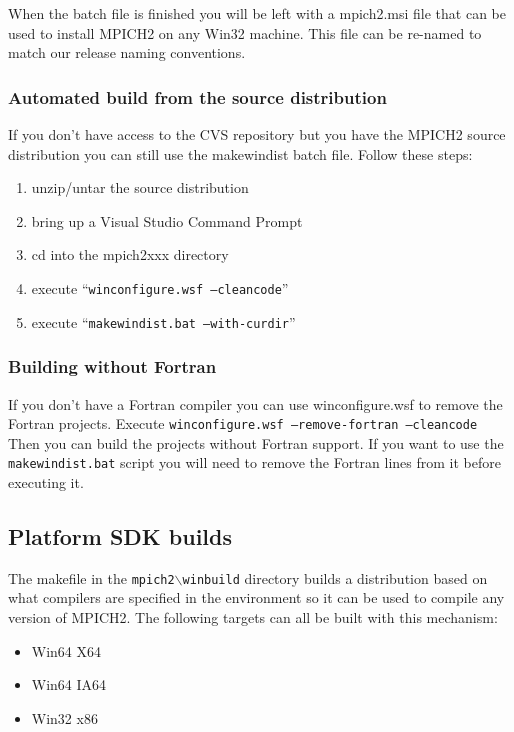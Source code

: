 \documentclass[dvipdfm,11pt]{article}
\begin{document}
When the batch file is finished you will be left with a mpich2.msi file that can be used to
install MPICH2 on any Win32 machine.  This file can be re-named to match our release naming 
conventions.

\subsubsection{Automated build from the source distribution}
If you don't have access to the CVS repository but you have the MPICH2 source
distribution you can still use the makewindist batch file.  Follow these steps:
\begin{enumerate}
\item unzip/untar the source distribution
\item bring up a Visual Studio Command Prompt
\item cd into the mpich2xxx directory
\item execute ``\texttt{winconfigure.wsf --cleancode}''
\item execute ``\texttt{makewindist.bat --with-curdir}''
\end{enumerate}

\subsubsection{Building without Fortran}
If you don't have a Fortran compiler you can use winconfigure.wsf to remove the
Fortran projects.  Execute \texttt{winconfigure.wsf --remove-fortran --cleancode}
Then you can build the projects without Fortran support.  If you want to use the
\texttt{makewindist.bat} script you will need to remove the Fortran lines from
it before executing it.

\subsection{Platform SDK builds}
\label{sec:psdk_build}

The makefile in the \texttt{mpich2$\backslash$winbuild} directory builds a distribution based 
on what compilers are specified in the environment so it can be used to compile any version of
MPICH2.  The following targets can all be built with this mechanism:
\begin{itemize}
\item Win64 X64
\item Win64 IA64
\item Win32 x86
\end{itemize}
\end{document}

